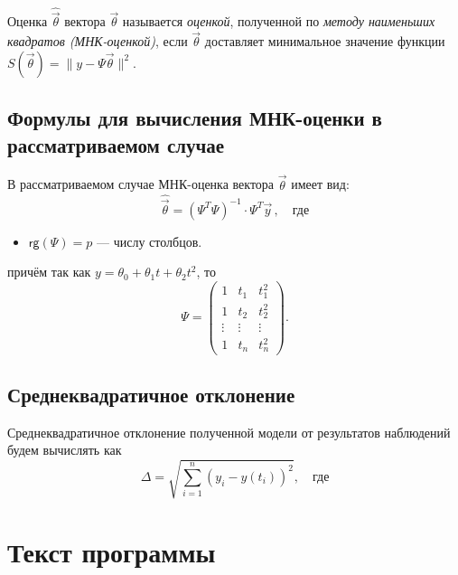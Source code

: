 \begin{defn}
    Оценка $\hat{\vec{\theta}}$ вектора $\vec{\theta}$ называется \emph{оценкой}, полученной по \emph{методу наименьших квадратов (МНК-оценкой)}, если $\vec{\theta}$ доставляет минимальное значение функции $S(\vec{\theta}) = \|y - \Psi \vec{\theta}\|^2$.
\end{defn}


\subsection{Формулы для вычисления МНК-оценки в рассматриваемом случае}

В рассматриваемом случае МНК-оценка вектора $\vec{\theta}$ имеет вид:
\begin{equation}
    \hat{\vec{\theta}} = (\Psi^T \Psi)^{-1} \cdot \Psi^T \vec{y}\,, \quad \text{где}
\end{equation}
\begin{itemize}
    \item $\mathsf{rg}(\Psi) = p$ --- числу столбцов.
\end{itemize}
причём так как $y = \theta_0 + \theta_1 t + \theta_2 t^2$, то
\begin{equation}
    \Psi = \begin{pmatrix}
        1      & t_1    & t_1^2  \\
        1      & t_2    & t_2^2  \\
        \vdots & \vdots & \vdots \\
        1      & t_n    & t_n^2
    \end{pmatrix}.
\end{equation}


\subsection{Среднеквадратичное отклонение}

Среднеквадратичное отклонение полученной модели от результатов наблюдений будем вычислять как
\begin{equation}
    \Delta = \sqrt{\sum_{i=1}^{n}\left(y_i - y(t_i)\right)^2}, \quad \text{где}
\end{equation}



\section{Текст программы}



